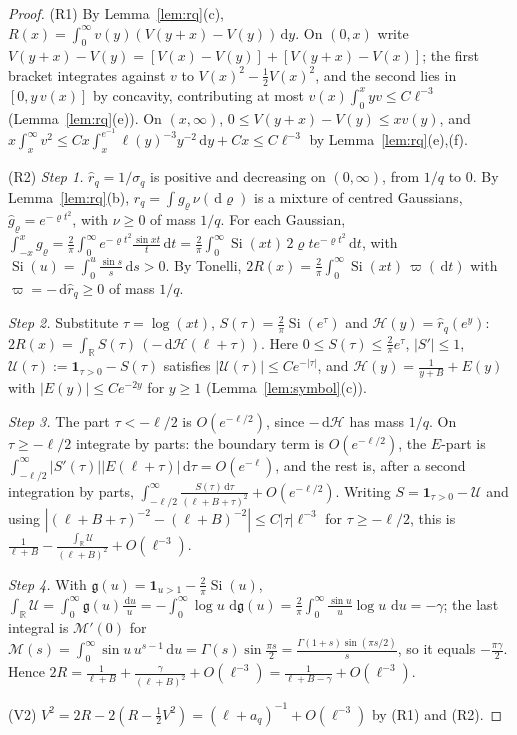 \documentclass[11pt]{amsart}
\newcommand{\R}{\mathbb{R}}
\newcommand{\one}{\mathbf{1}}
\newcommand{\dd}{\,\mathrm{d}}
\DeclareMathOperator{\Si}{Si}
\theoremstyle{definition}
\theoremstyle{remark}
\numberwithin{equation}{section}
\begin{document}
\begin{proof}
(R1) By Lemma~\ref{lem:rq}(c), $R(x)=\int_0^\infty v(y)(V(y+x)-V(y))\dd y$. On $(0,x)$ write $V(y+x)-V(y)=[V(x)-V(y)]+[V(y+x)-V(x)]$; the first bracket integrates against $v$ to $V(x)^2-\frac12V(x)^2$, and the second lies in $[0,y\,v(x)]$ by concavity, contributing at most $v(x)\int_0^xyv\le C\ell^{-3}$ (Lemma~\ref{lem:rq}(e)). On $(x,\infty)$, $0\le V(y+x)-V(y)\le xv(y)$, and $x\int_x^\infty v^2\le Cx\int_x^{e^{-1}}\ell(y)^{-3}y^{-2}\dd y+Cx\le C\ell^{-3}$ by Lemma~\ref{lem:rq}(e),(f).

(R2) \emph{Step 1.} $\hat r_q=1/\sigma_q$ is positive and decreasing on $(0,\infty)$, from $1/q$ to $0$. By Lemma~\ref{lem:rq}(b), $r_q=\int g_\varrho\,\nu(\dd\varrho)$ is a mixture of centred Gaussians, $\hat g_\varrho=e^{-\varrho t^2}$, with $\nu\ge0$ of mass $1/q$. For each Gaussian, $\int_{-x}^xg_\varrho=\frac2\pi\int_0^\infty e^{-\varrho t^2}\frac{\sin xt}t\dd t=\frac2\pi\int_0^\infty\Si(xt)\,2\varrho te^{-\varrho t^2}\dd t$, with $\Si(u)=\int_0^u\frac{\sin s}s\dd s>0$. By Tonelli, $2R(x)=\frac2\pi\int_0^\infty\Si(xt)\,\varpi(\dd t)$ with $\varpi=-\dd\hat r_q\ge0$ of mass $1/q$.

\emph{Step 2.} Substitute $\tau=\log(xt)$, $S(\tau)=\frac2\pi\Si(e^\tau)$ and $\mathcal H(y)=\hat r_q(e^y)$: $2R(x)=\int_\R S(\tau)\,(-\dd\mathcal H(\ell+\tau))$. Here $0\le S(\tau)\le\frac2\pi e^\tau$, $|S'|\le1$, $\mathcal U(\tau):=\one_{\tau>0}-S(\tau)$ satisfies $|\mathcal U(\tau)|\le Ce^{-|\tau|}$, and $\mathcal H(y)=\frac1{y+B}+E(y)$ with $|E(y)|\le Ce^{-2y}$ for $y\ge1$ (Lemma~\ref{lem:symbol}(c)).

\emph{Step 3.} The part $\tau<-\ell/2$ is $O(e^{-\ell/2})$, since $-\dd\mathcal H$ has mass $1/q$. On $\tau\ge-\ell/2$ integrate by parts: the boundary term is $O(e^{-\ell/2})$, the $E$-part is $\int_{-\ell/2}^\infty|S'(\tau)||E(\ell+\tau)|\dd\tau=O(e^{-\ell})$, and the rest is, after a second integration by parts, $\int_{-\ell/2}^\infty\frac{S(\tau)\dd\tau}{(\ell+B+\tau)^2}+O(e^{-\ell/2})$. Writing $S=\one_{\tau>0}-\mathcal U$ and using $|(\ell+B+\tau)^{-2}-(\ell+B)^{-2}|\le C|\tau|\ell^{-3}$ for $\tau\ge-\ell/2$, this is $\frac1{\ell+B}-\frac{\int_\R\mathcal U}{(\ell+B)^2}+O(\ell^{-3})$.

\emph{Step 4.} With $\mathfrak g(u)=\one_{u>1}-\frac2\pi\Si(u)$, $\int_\R\mathcal U=\int_0^\infty\mathfrak g(u)\frac{\dd u}u=-\int_0^\infty\log u\,\dd\mathfrak g(u)=\frac2\pi\int_0^\infty\frac{\sin u}u\log u\,\dd u=-\gamma$; the last integral is $\mathcal M'(0)$ for $\mathcal M(s)=\int_0^\infty\sin u\,u^{s-1}\dd u=\Gamma(s)\sin\frac{\pi s}2=\frac{\Gamma(1+s)\sin(\pi s/2)}s$, so it equals $-\frac{\pi\gamma}2$. Hence $2R=\frac1{\ell+B}+\frac\gamma{(\ell+B)^2}+O(\ell^{-3})=\frac1{\ell+B-\gamma}+O(\ell^{-3})$.

(V2) $V^2=2R-2(R-\frac12V^2)=(\ell+a_q)^{-1}+O(\ell^{-3})$ by (R1) and (R2).
\end{proof}
\end{document}
